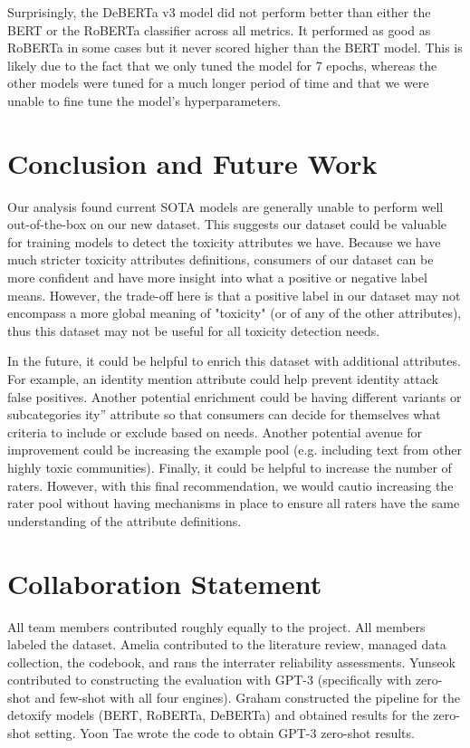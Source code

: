 \documentclass[11pt]{article}
\begin{document}
Surprisingly, the DeBERTa v3 model did not perform better than either the BERT or the RoBERTa classifier across all metrics.  It performed as good as RoBERTa in some cases but it never scored higher than the BERT model.  This is likely due to the fact that we only tuned the model for 7 epochs, whereas the other models were tuned for a much longer period of time and that we were unable to fine tune the model’s hyperparameters.

\section{Conclusion and Future Work}

Our analysis found current SOTA models are generally unable to perform well out-of-the-box on our new dataset. This suggests our dataset could be valuable for training models to detect the toxicity attributes we have. Because we have much stricter toxicity attributes definitions, consumers of our dataset can be more confident and have more insight into what a positive or negative label means. However, the trade-off here is that a positive label in our dataset may not encompass a more global meaning of "toxicity" (or of any of the other attributes), thus this dataset may not be useful for all toxicity detection needs.

In the future, it could be helpful to enrich this dataset with additional attributes. For example, an identity mention attribute could help prevent identity attack false positives. Another potential enrichment could be having different variants or subcategories ity''  attribute so that consumers can decide for themselves what criteria to include or exclude based on needs. Another potential avenue for improvement could be increasing the example pool (e.g. including text from other highly toxic communities). Finally, it could be helpful to increase the number of raters. However, with this final recommendation, we would cautio increasing the rater pool without having mechanisms in place to ensure all raters have the same understanding of the attribute definitions. 


\section{Collaboration Statement}
All team members contributed roughly equally to the project. All members labeled the dataset. Amelia contributed to the literature review, managed data collection, the codebook, and rans the interrater reliability assessments. Yunseok contributed to constructing the evaluation with GPT-3 (specifically with  zero-shot and few-shot with all four engines). Graham constructed the pipeline for the detoxify models (BERT,  RoBERTa, DeBERTa) and obtained results for the zero-shot setting. Yoon Tae wrote the code to obtain GPT-3 zero-shot results.
\end{document}
